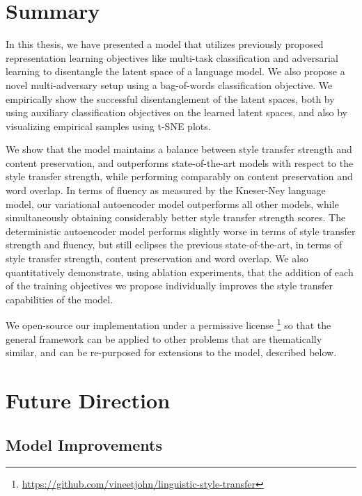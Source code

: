 \section{Summary}

In this thesis, we have presented a model that utilizes previously proposed representation learning objectives like multi-task classification and adversarial learning to disentangle the latent space of a language model. We also propose a novel multi-adversary setup using a bag-of-words classification objective. We empirically show the successful disentanglement of the latent spaces, both by using auxiliary classification objectives on the learned latent spaces, and also by visualizing empirical samples using t-SNE plots.

We show that the model maintains a balance between style transfer strength and content preservation, and outperforms state-of-the-art models with respect to the style transfer strength, while performing comparably on content preservation and word overlap. In terms of fluency as measured by the Kneser-Ney language model, our variational autoencoder model outperforms all other models, while simultaneously obtaining considerably better style transfer strength scores. The deterministic autoencoder model performs slightly worse in terms of style transfer strength and fluency, but still eclipses the previous state-of-the-art, in terms of style transfer strength, content preservation and word overlap. We also quantitatively demonstrate, using ablation experiments, that the addition of each of the training objectives we propose individually improves the style transfer capabilities of the model.

We open-source our implementation under a permissive license \footnote{\url{https://github.com/vineetjohn/linguistic-style-transfer}} so that the general framework can be applied to other problems that are thematically similar, and can be re-purposed for extensions to the model, described below.


\section{Future Direction}

\subsection{Model Improvements}

